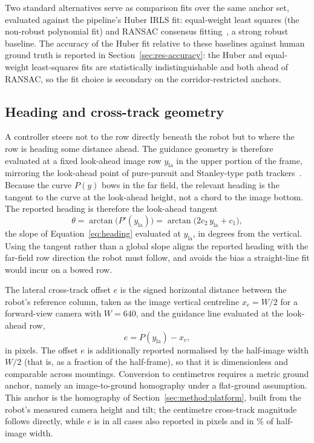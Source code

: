 Two standard alternatives serve as comparison fits over the same anchor set, evaluated against the
pipeline's Huber IRLS fit: equal-weight least squares (the non-robust polynomial fit) and RANSAC consensus
fitting~\cite{fischler1981}, a strong robust baseline. The accuracy of the Huber fit relative to these
baselines against human ground truth is reported in Section~\ref{sec:res-accuracy}: the Huber and
equal-weight least-squares fits are statistically indistinguishable and both ahead of RANSAC, so the fit
choice is secondary on the corridor-restricted anchors.

\subsection{Heading and cross-track geometry}
\label{sec:method:lookahead}

\noindent A controller steers not to the row directly beneath the robot but to where the row is heading some
distance ahead. The guidance geometry is therefore evaluated at a fixed look-ahead image row
$y_{\mathrm{la}}$ in the upper portion of the frame, mirroring the look-ahead point of pure-pursuit and
Stanley-type path trackers~\cite{coulter1992,stanley2006,rajamani2012}. Because the curve $P(y)$ bows in the
far field, the relevant heading is the tangent to the curve at the look-ahead height, not a chord to the image
bottom. The reported heading is therefore the look-ahead tangent
\begin{equation}
\label{eq:heading_la}
\theta = \arctan\!\bigl(P'(y_{\mathrm{la}})\bigr)
       = \arctan\!\bigl(2c_2\,y_{\mathrm{la}} + c_1\bigr),
\end{equation}
the slope of Equation~\eqref{eq:heading} evaluated at $y_{\mathrm{la}}$, in degrees from the vertical.
Using the tangent rather than a global slope aligns the reported heading with the far-field row direction
the robot must follow, and avoids the bias a straight-line fit would incur on a bowed row.

The lateral cross-track offset $e$ is the signed horizontal distance between the robot's reference column,
taken as the image vertical centreline $x_c = W/2$ for a forward-view camera with $W=640$, and the guidance
line evaluated at the look-ahead row,
\begin{equation}
\label{eq:crosstrack}
e = P(y_{\mathrm{la}}) - x_c ,
\end{equation}
in pixels. The offset $e$ is additionally reported normalised by the half-image width $W/2$ (that is, as a
fraction of the half-frame), so that it is dimensionless and comparable across mountings. Conversion to
centimetres requires a metric ground anchor, namely an image-to-ground homography under a flat-ground
assumption. This anchor is the homography of Section~\ref{sec:method:platform}, built from the robot's
measured camera height and tilt; the centimetre cross-track magnitude follows directly, while $e$ is in
all cases also reported in pixels and in \% of half-image width.

